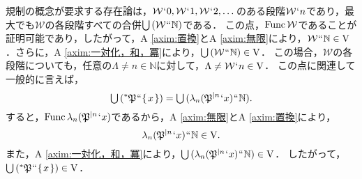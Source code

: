 \noindent 規制の概念が要求する存在論は，$ \mathcal{W}\fap 0,\mathcal{W}\fap 1,\mathcal{W}\fap 2,\dots $のある段階$ \mathcal{W}\fap n $であり，最大でも$\mathcal{W}$の各段階すべての合併$ \union{(\mathcal{W}\img\mathbb{N})} $である．
この点，$\func{\mathcal{W}}$であることが証明可能であり，したがって，A \ref{axim:置換}とA \ref{axim:無限}により，$ \mathcal{W}\img\mathbb{N}\in\univ $．さらに，A \ref{axim:一対化，和，冪}により，$\union{(\mathcal{W}\img\mathbb{N})}\in\univ$．
この場合，$\mathcal{W}$の各段階についても，任意の$\Lambda\neq n\in\mathbb{N}$に対して，$ \Lambda\neq \mathcal{W}\fap n\in\univ $．
この点に関連して一般的に言えば，
\[
    \union{(\ance{\mathfrak{P}}\img\classab{x})}= \union{(\lambda_n(\iter{\mathfrak{P}}{n}\fap x)\img\mathbb{N})}.
\]
すると，$ \func{\lambda_n(\iter{\mathfrak{P}}{n}\fap x)} $であるから，A \ref{axim:無限}とA \ref{axim:置換}により，
\[
    \lambda_n(\iter{\mathfrak{P}}{n}\fap x)\img\mathbb{N}\in\univ.
\]
また，A \ref{axim:一対化，和，冪}により，$ \union{(\lambda_n(\iter{\mathfrak{P}}{n}\fap x)\img\mathbb{N})}\in\univ $．
したがって，$ \union{(\ance{\mathfrak{P}}\img\classab{x})}\in\univ $．


